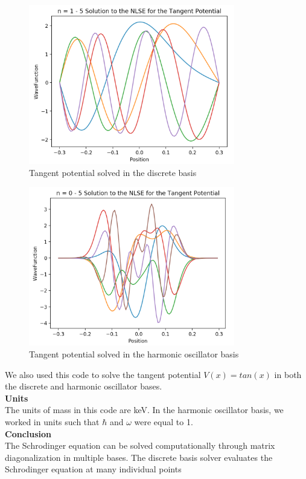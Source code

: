 \documentclass[%
 reprint,
 amsmath,amssymb,
 aps,
]{revtex4-1}
\begin{document}
\begin{figure}
\includegraphics[width=9cm]{DiscreteBasisTangent}
\caption{Tangent potential solved in the discrete basis}
\end{figure}
\begin{figure}
\includegraphics[width=9cm]{HOBasisTangent}
\caption{Tangent potential solved in the harmonic oscillator basis}
\end{figure}

\noindent We also used this code to solve the tangent potential $V(x) = tan(x)$ in both the discrete and harmonic oscillator bases.\\

\noindent \textbf{Units}\\

\noindent The units of mass in this code are keV.  In the harmonic oscillator basis, we worked in units such that $\hbar$ and $\omega$ were equal to 1.\\

\noindent \textbf{Conclusion}\\

\noindent The Schrodinger equation can be solved computationally through matrix diagonalization in multiple bases.  The discrete basis solver evaluates the Schrodinger equation at many individual points
\end{document}
